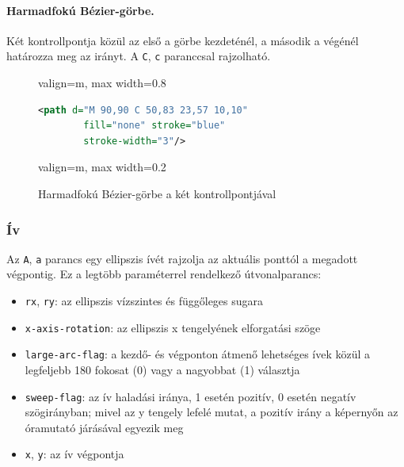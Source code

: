 \paragraph{Harmadfokú Bézier-görbe.} Két kontrollpontja közül az első a görbe kezdeténél, a második a végénél határozza meg az irányt. A \texttt{C}, \texttt{c} paranccsal rajzolható.

\begin{figure}[H]
    \centering
    \begin{adjustbox}{valign=m, max width=0.8\textwidth}
        \begin{lstlisting}[language=XML]
    <path d="M 90,90 C 50,83 23,57 10,10"
        fill="none" stroke="blue"
        stroke-width="3"/>
        \end{lstlisting}
    \end{adjustbox}
    \hfill
    \begin{adjustbox}{valign=m, max width=0.2\textwidth}
        
    \end{adjustbox}
    \caption{Harmadfokú Bézier-görbe a két kontrollpontjával}
    \label{fig:example_path_cubic_bezier}
\end{figure}

\subsubsection{Ív}
\label{sub:arc}

Az \texttt{A}, \texttt{a} parancs egy ellipszis ívét rajzolja az aktuális ponttól a megadott végpontig. Ez a legtöbb paraméterrel rendelkező útvonalparancs:

\begin{itemize}
\item \texttt{rx}, \texttt{ry}: az ellipszis vízszintes és függőleges sugara
\item \texttt{x-axis-rotation}: az ellipszis x tengelyének elforgatási szöge
\item \texttt{large-arc-flag}: a kezdő- és végponton átmenő lehetséges ívek közül a legfeljebb 180 fokosat (0) vagy a nagyobbat (1) választja
\item \texttt{sweep-flag}: az ív haladási iránya, 1 esetén pozitív, 0 esetén negatív szögirányban; mivel az y tengely lefelé mutat, a pozitív irány a képernyőn az óramutató járásával egyezik meg
\item \texttt{x}, \texttt{y}: az ív végpontja
\end{itemize}

